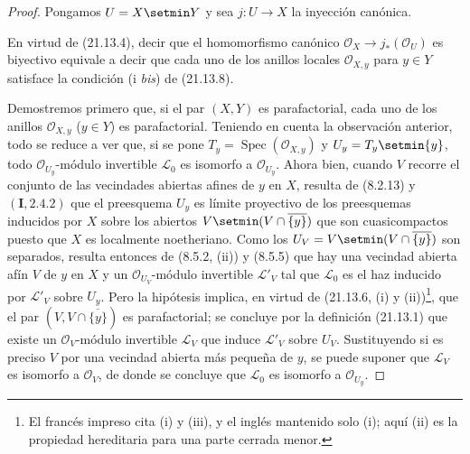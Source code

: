 \begin{proof}
Pongamos $U=X\setmin Y$ y sea $j:U\to X$ la inyección canónica.

En virtud de (21.13.4), decir que el homomorfismo canónico
$\mathcal O_X\to j_*(\mathcal O_U)$ es biyectivo equivale a decir que cada uno de los
anillos locales $\mathcal O_{X,y}$ para $y\in Y$ satisface la condición (i \emph{bis}) de
(21.13.8).

Demostremos primero que, si el par $(X,Y)$ es parafactorial, cada uno de los anillos
$\mathcal O_{X,y}$ ($y\in Y$) es parafactorial. Teniendo en cuenta la observación
anterior, todo se reduce a ver que, si se pone
$T_y=\operatorname{Spec}(\mathcal O_{X,y})$ y $U_y=T_y\setmin\{y\}$, todo
$\mathcal O_{U_y}$-módulo invertible $\mathscr L_0$ es isomorfo a
$\mathcal O_{U_y}$. Ahora bien, cuando $V$ recorre el conjunto de las vecindades abiertas
afines de $y$ en $X$, resulta de (8.2.13) y $(\mathbf I, 2.4.2)$ que el
preesquema $U_y$ es límite proyectivo de los preesquemas inducidos por $X$ sobre los abiertos
$V\setmin(V\cap\overline{\{y\}})$ que son cuasicompactos puesto que $X$ es localmente
noetheriano. Como los $U_V=V\setmin(V\cap\overline{\{y\}})$ son separados, resulta entonces de
(8.5.2, (ii)) y (8.5.5) que hay una vecindad abierta afín $V$ de $y$ en $X$ y
un $\mathcal O_{U_V}$-módulo invertible $\mathscr L'_V$ tal que $\mathscr L_0$ es el
haz inducido por $\mathscr L'_V$ sobre $U_y$. Pero la hipótesis implica, en virtud de
(21.13.6, (i) y (ii))\footnote{El francés impreso cita (i) y (iii), y el inglés mantenido solo (i); aquí (ii) es la propiedad
hereditaria para una parte cerrada menor.}, que el par $(V,V\cap\overline{\{y\}})$ es parafactorial;
se concluye por la definición (21.13.1) que existe un $\mathcal O_V$-módulo invertible
$\mathscr L_V$ que induce $\mathscr L'_V$ sobre $U_V$. Sustituyendo si es preciso $V$ por una
vecindad abierta más pequeña de $y$, se puede suponer que $\mathscr L_V$ es isomorfo
a $\mathcal O_V$, de donde se concluye que $\mathscr L_0$ es isomorfo a
$\mathcal O_{U_y}$.


\end{proof}
